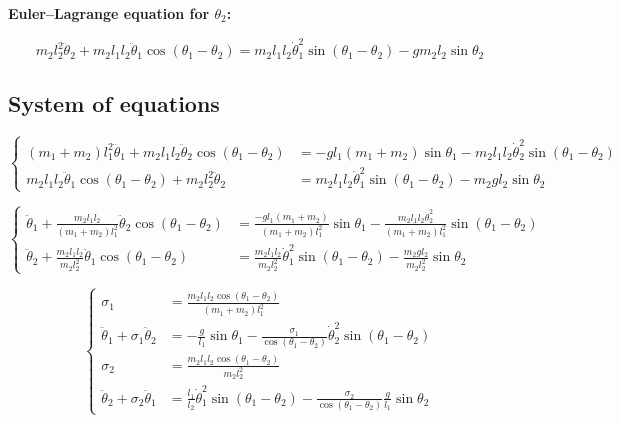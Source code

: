 \documentclass[11pt,a4paper]{article}
\begin{document}
\textbf{Euler--Lagrange equation for $\theta_2$:}

\[ m_2 l_2^2 \ddot{\theta}_2 + m_2 l_1 l_2 \ddot{\theta}_1 \cos(\theta_1 - \theta_2)
  = m_2 l_1 l_2 \dot{\theta}_1^2 \sin(\theta_1 - \theta_2) - g m_2 l_2 \sin\theta_2 \]

\subsection{System of equations}

\[
\left\{
\begin{aligned}
(m_1 + m_2) l_1^2 \ddot{\theta}_1 + m_2 l_1 l_2 \ddot{\theta}_2 \cos(\theta_1 - \theta_2) &= -g l_1 (m_1 + m_2) \sin\theta_1 - m_2 l_1 l_2 \dot{\theta}_2^2 \sin(\theta_1 - \theta_2) \\
m_2 l_1 l_2 \ddot{\theta}_1 \cos(\theta_1 - \theta_2) + m_2 l_2^2 \ddot{\theta}_2 &= m_2 l_1 l_2 \dot{\theta}_1^2 \sin(\theta_1 - \theta_2) - m_2 g l_2 \sin\theta_2
\end{aligned}
\right.
\]

\[
\left\{
\begin{aligned}
\ddot{\theta}_1 + \frac{m_2 l_1 l_2}{(m_1 + m_2) l_1^2} \ddot{\theta}_2 \cos(\theta_1 - \theta_2) &= \frac{-g l_1 (m_1 + m_2)}{(m_1 + m_2) l_1^2} \sin\theta_1 - \frac{m_2 l_1 l_2 \dot{\theta}_2^2}{(m_1 + m_2) l_1^2} \sin(\theta_1 - \theta_2) \\
\ddot{\theta}_2 + \frac{m_2 l_1 l_2}{m_2 l_2^2} \ddot{\theta}_1 \cos(\theta_1 - \theta_2) &= \frac{m_2 l_1 l_2}{m_2 l_2^2} \dot{\theta}_1^2 \sin(\theta_1 - \theta_2) - \frac{m_2 g l_2}{m_2 l_2^2} \sin\theta_2
\end{aligned}
\right.
\]

\[
\left\{
\begin{aligned}
\sigma_1 &= \frac{m_2 l_1 l_2 \cos(\theta_1 - \theta_2)}{(m_1 + m_2) l_1^2} \\
\ddot{\theta}_1 + \sigma_1 \ddot{\theta}_2 &= -\frac{g}{l_1} \sin\theta_1 - \frac{\sigma_1}{\cos(\theta_1 - \theta_2)} \dot{\theta}_2^2 \sin(\theta_1 - \theta_2) \\
\sigma_2 &= \frac{m_2 l_1 l_2 \cos(\theta_1 - \theta_2)}{m_2 l_2^2} \\
\ddot{\theta}_2 + \sigma_2 \ddot{\theta}_1 &= \frac{l_1}{l_2} \dot{\theta}_1^2 \sin(\theta_1 - \theta_2) - \frac{\sigma_2}{\cos(\theta_1 - \theta_2)} \frac{g}{l_1} \sin\theta_2
\end{aligned}
\right.
\]
\end{document}
